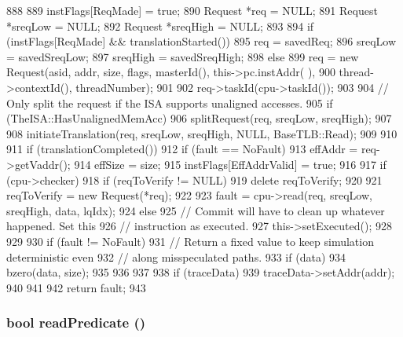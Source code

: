 \begin{DoxyCode}
888 {
889     instFlags[ReqMade] = true;
890     Request *req = NULL;
891     Request *sreqLow = NULL;
892     Request *sreqHigh = NULL;
893 
894     if (instFlags[ReqMade] && translationStarted()) {
895         req = savedReq;
896         sreqLow = savedSreqLow;
897         sreqHigh = savedSreqHigh;
898     } else {
899         req = new Request(asid, addr, size, flags, masterId(), this->pc.instAddr(
      ),
900                           thread->contextId(), threadNumber);
901 
902         req->taskId(cpu->taskId());
903 
904         // Only split the request if the ISA supports unaligned accesses.
905         if (TheISA::HasUnalignedMemAcc) {
906             splitRequest(req, sreqLow, sreqHigh);
907         }
908         initiateTranslation(req, sreqLow, sreqHigh, NULL, BaseTLB::Read);
909     }
910 
911     if (translationCompleted()) {
912         if (fault == NoFault) {
913             effAddr = req->getVaddr();
914             effSize = size;
915             instFlags[EffAddrValid] = true;
916 
917             if (cpu->checker) {
918                 if (reqToVerify != NULL) {
919                     delete reqToVerify;
920                 }
921                 reqToVerify = new Request(*req);
922             }
923             fault = cpu->read(req, sreqLow, sreqHigh, data, lqIdx);
924         } else {
925             // Commit will have to clean up whatever happened.  Set this
926             // instruction as executed.
927             this->setExecuted();
928         }
929 
930         if (fault != NoFault) {
931             // Return a fixed value to keep simulation deterministic even
932             // along misspeculated paths.
933             if (data)
934                 bzero(data, size);
935         }
936     }
937 
938     if (traceData) {
939         traceData->setAddr(addr);
940     }
941 
942     return fault;
943 }
\end{DoxyCode}
\hypertarget{classBaseDynInst_a254cecc48d457ea298b08a8bb009f9cf}{
\subsubsection[{readPredicate}]{\setlength{\rightskip}{0pt plus 5cm}bool readPredicate ()}}
\label{classBaseDynInst_a254cecc48d457ea298b08a8bb009f9cf}



